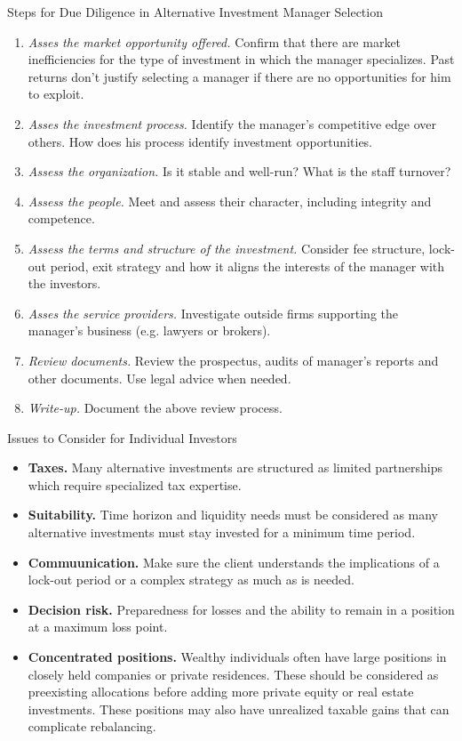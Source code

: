 \documentclass[../custom,grid]{flashcards}
\begin{document}
\begin{flashcard}{Steps for Due Diligence in Alternative Investment Manager Selection}
    \begin{enumerate}
        \item \textit{Asses the market opportunity offered.} Confirm that there are market inefficiencies for the type of investment in which the manager specializes. Past returns don't justify selecting a manager if there are no opportunities for him to exploit.
        \item \textit{Asses the investment process.} Identify the manager's competitive edge over others. How does his process identify investment opportunities.
        \item \textit{Assess the organization.} Is it stable and well-run? What is the staff turnover?
        \item \textit{Assess the people.} Meet and assess their character, including integrity and competence.
        \item \textit{Assess the terms and structure of the investment.} Consider fee structure, lock-out period, exit strategy and how it aligns the interests of the manager with the investors.
        \item \textit{Asses the service providers.} Investigate outside firms supporting the manager's business (e.g. lawyers or brokers).
        \item \textit{Review documents.} Review the prospectus, audits of manager's reports and other documents. Use legal advice when needed.
        \item \textit{Write-up.} Document the above review process.
    \end{enumerate}
\end{flashcard}

\begin{flashcard}{Issues to Consider for Individual Investors}
    \begin{itemize}
        \item \textbf{Taxes.} Many alternative investments are structured as limited partnerships which require specialized tax expertise.
        \item \textbf{Suitability.} Time horizon and liquidity needs must be considered as many alternative investments must stay invested for a minimum time period.
        \item \textbf{Commuunication.} Make sure the client understands the implications of a lock-out period or a complex strategy as much as is needed.
        \item \textbf{Decision risk.} Preparedness for losses and the ability to remain in a position at a maximum loss point.
        \item \textbf{Concentrated positions.} Wealthy individuals often have large positions in closely held companies or private residences. These should be considered as preexisting allocations before adding more private equity or real estate investments. These positions may also have unrealized taxable gains that can complicate rebalancing.
    \end{itemize}
\end{flashcard}
\end{document}
